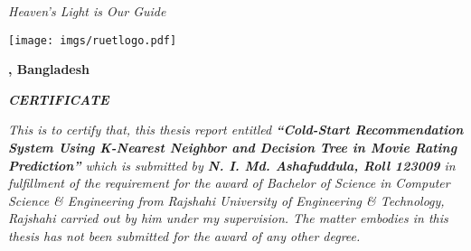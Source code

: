 \documentclass[document.tex]{subfiles}
\begin{document}
	
	
	\begin{center}
		\textit{Heaven's Light is Our Guide}
		\vspace{1cm}
		
		\texttt{[image: imgs/ruetlogo.pdf]}
		
		\vspace{1cm}
		\textbf{{\fontsize{12pt}{0.5cm} \selectfont \dept}}
		
		\vspace{0.5cm}
		\textbf{{\fontsize{14pt}{0.5cm}\selectfont \ruet, Bangladesh}}
		
		\vspace{1cm}
		\textbf{{\fontsize{16pt}{0.5cm}\selectfont \textit{CERTIFICATE}}}
		
		\vspace{.5cm}
		
	\end{center}
	
	\noindent \textit{This is to certify that, this thesis report entitled \textbf{“Cold-Start Recommendation System Using K-Nearest Neighbor and Decision Tree in Movie Rating Prediction”} which is submitted by \textbf{N. I. Md. Ashafuddula, Roll 123009} in fulfillment of the requirement for the award of Bachelor of Science in Computer Science \& Engineering from Rajshahi University of Engineering \& Technology, Rajshahi carried out by him under my supervision. The matter embodies in this thesis has not been submitted for the award of any other degree.}
	
\end{document}
